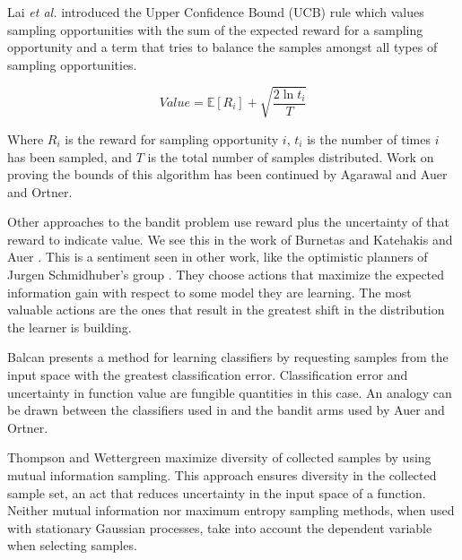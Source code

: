 Lai \emph{et al.} \cite{lai1985asymptotically} introduced the Upper Confidence
Bound (UCB) rule which values sampling opportunities with the sum of the expected reward for a sampling opportunity and a term that tries to balance the samples amongst all types of sampling opportunities.

$$
Value = \mathbb{E}\left[R_i\right] + \sqrt{\frac{2\ln t_i}{T}}
$$

Where $R_i$ is the reward for sampling opportunity $i$, $t_i$ is the number of times $i$ has been sampled, and $T$ is the total number of samples distributed.  Work on proving the bounds of this algorithm has been continued by Agarawal \cite{agrawal1995sample} and Auer and Ortner\cite{auer2010ucb}.  


Other approaches to the bandit problem use reward plus the uncertainty of that
reward to indicate value.  We see this in the work of Burnetas and Katehakis
\cite{burnetas1997optimal} and Auer \cite{auer2003using}.  This is a sentiment
seen in other work, like the optimistic planners of Jurgen Schmidhuber's group
\cite{schmidhuber1997what,schmidhuber2003exploring,schmidhuber2009simple,sun2011planning}.
They choose actions that maximize the expected information gain with respect to
some model they are learning.  The most valuable actions are the ones that
result in the greatest shift in the distribution the learner is building.

Balcan \cite{balcan2006agnostic} presents a method for learning classifiers by
requesting samples from the input space with the greatest classification
error.  Classification error and uncertainty in function value
are fungible quantities in this case.  An analogy can be drawn between
the classifiers used in \cite{balcan2006agnostic} and the bandit arms used by
Auer and Ortner\cite{auer2010ucb}.

Thompson and Wettergreen \cite{thompson2008intelligent} maximize diversity of
collected samples by using mutual information sampling.  This approach ensures
diversity in the collected sample set, an act that reduces uncertainty in the
input space of a function.  Neither mutual information nor maximum entropy
sampling methods, when used with stationary Gaussian processes, take into
account the dependent variable when selecting samples.  

